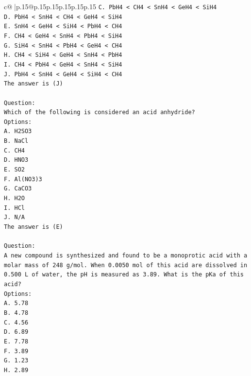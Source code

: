 \documentclass{article}
\begin{document}
{\begin{supertabular}{c@{$\;$}|p{.15\linewidth}@{}p{.15\linewidth}p{.15\linewidth}p{.15\linewidth}p{.15\linewidth}p{.15\linewidth}}
{{{\texttt{C. PbH4 < CH4 < SnH4 < GeH4 < SiH4} \\
\texttt{D. PbH4 < SnH4 < CH4 < GeH4 < SiH4} \\
\texttt{E. SnH4 < GeH4 < SiH4 < PbH4 < CH4} \\
\texttt{F. CH4 < GeH4 < SnH4 < PbH4 < SiH4} \\
\texttt{G. SiH4 < SnH4 < PbH4 < GeH4 < CH4} \\
\texttt{H. CH4 < SiH4 < GeH4 < SnH4 < PbH4} \\
\texttt{I. CH4 < PbH4 < GeH4 < SnH4 < SiH4} \\
\texttt{J. PbH4 < SnH4 < GeH4 < SiH4 < CH4} \\
\texttt{The answer is (J)} \\
\\ 
\texttt{Question:} \\
\texttt{Which of the following is considered an acid anhydride?} \\
\texttt{Options:} \\
\texttt{A. H2SO3} \\
\texttt{B. NaCl} \\
\texttt{C. CH4} \\
\texttt{D. HNO3} \\
\texttt{E. SO2} \\
\texttt{F. Al(NO3)3} \\
\texttt{G. CaCO3} \\
\texttt{H. H2O} \\
\texttt{I. HCl} \\
\texttt{J. N/A} \\
\texttt{The answer is (E)} \\
\\ 
\texttt{Question:} \\
\texttt{A new compound is synthesized and found to be a monoprotic acid with a molar mass of 248 g/mol. When 0.0050 mol of this acid are dissolved in 0.500 L of water, the pH is measured as 3.89. What is the pKa of this acid?} \\
\texttt{Options:} \\
\texttt{A. 5.78} \\
\texttt{B. 4.78} \\
\texttt{C. 4.56} \\
\texttt{D. 6.89} \\
\texttt{E. 7.78} \\
\texttt{F. 3.89} \\
\texttt{G. 1.23} \\
\texttt{H. 2.89} \\
}}}
\end{supertabular}}
\end{document}
